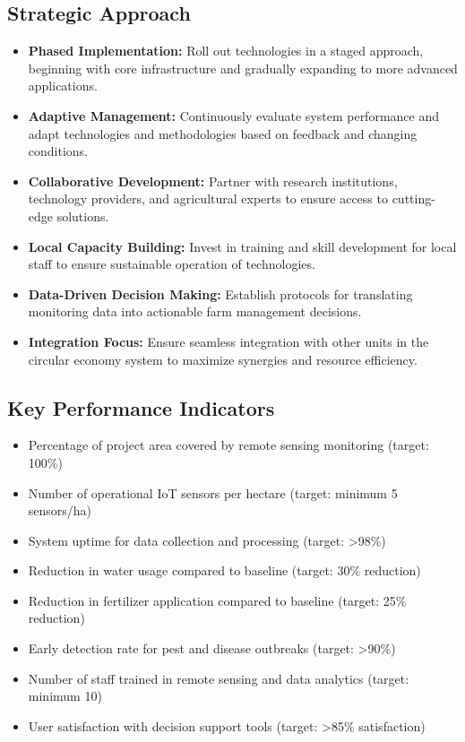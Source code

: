 \subsection{Strategic Approach}
\begin{itemize}
    \item \textbf{Phased Implementation:} Roll out technologies in a staged approach, beginning with core infrastructure and gradually expanding to more advanced applications.
    
    \item \textbf{Adaptive Management:} Continuously evaluate system performance and adapt technologies and methodologies based on feedback and changing conditions.
    
    \item \textbf{Collaborative Development:} Partner with research institutions, technology providers, and agricultural experts to ensure access to cutting-edge solutions.
    
    \item \textbf{Local Capacity Building:} Invest in training and skill development for local staff to ensure sustainable operation of technologies.
    
    \item \textbf{Data-Driven Decision Making:} Establish protocols for translating monitoring data into actionable farm management decisions.
    
    \item \textbf{Integration Focus:} Ensure seamless integration with other units in the circular economy system to maximize synergies and resource efficiency.
\end{itemize}

\subsection{Key Performance Indicators}
\begin{itemize}
    \item Percentage of project area covered by remote sensing monitoring (target: 100\%)
    \item Number of operational IoT sensors per hectare (target: minimum 5 sensors/ha)
    \item System uptime for data collection and processing (target: >98\%)
    \item Reduction in water usage compared to baseline (target: 30\% reduction)
    \item Reduction in fertilizer application compared to baseline (target: 25\% reduction)
    \item Early detection rate for pest and disease outbreaks (target: >90\%)
    \item Number of staff trained in remote sensing and data analytics (target: minimum 10)
    \item User satisfaction with decision support tools (target: >85\% satisfaction)
\end{itemize}

